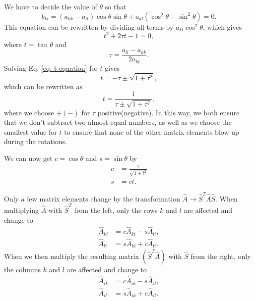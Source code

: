 \documentclass[%
 reprint,
nofootinbib,
aps,
]{revtex4-1}
\begin{document}
We have to decide the value of $\theta$ so that
\begin{equation}
b_{kl} = (a_{kk} -a_{ll})\cos\theta\sin\theta + a_{kl}(\cos^2\theta - \sin^2\theta) = 0.
\end{equation}
This equation can be rewritten by dividing all terms by $a_{kl}\cos^2\theta$, which gives
\begin{equation}\label{eq: t-equation}
t^2 + 2\tau t - 1 = 0,
\end{equation}
where $t = \tan\theta$ and
\begin{equation}
\tau = \frac{a_{ll}-a_{kk}}{2a_{kl}}.
\end{equation}
Solving Eq. \eqref{eq: t-equation} for $t$ gives
\begin{equation}
t = -\tau \pm \sqrt{1 + \tau^2},
\end{equation}
which can be rewritten as
\begin{equation}
t = \frac{1}{\tau \pm \sqrt{1 + \tau^2}},
\end{equation}
where we choose $+(-)$ for $\tau$ positive(negative). In this way, we both ensure that we don't subtract two almost equal numbers, as well as we choose the smallest value for $t$ to ensure that none of the other matrix elements blow up during the rotations\cite{hjorten}.

We can now get $c = \cos\theta$ and $s = \sin\theta$ by
\begin{align}
c &= \frac{1}{\sqrt{1 + t^2}}\\
s &= ct.
\end{align}

Only a few matrix elements change by the transformation $\hat{A} \rightarrow \hat{S}^T\hat{A}\hat{S}$. When multiplying $\hat{A}$ with $\hat{S}^T$ from the left, only the rows $k$ and $l$ are affected and change to
\begin{align}
\hat{A}_{ki} &= c\hat{A}_{ki} - s\hat{A}_{li},\\
\hat{A}_{li} &= s\hat{A}_{ki} + c\hat{A}_{li}.
\end{align}
When we then multiply the resulting matrix $(\hat{S}^T\hat{A})$ with $\hat{S}$ from the right, only the columns $k$ and $l$ are affected and change to
\begin{align}
\hat{A}_{ik} &= c\hat{A}_{ik} - s\hat{A}_{il},\\
\hat{A}_{il} &= s\hat{A}_{ik} + c\hat{A}_{il}.
\end{align}
\end{document}
